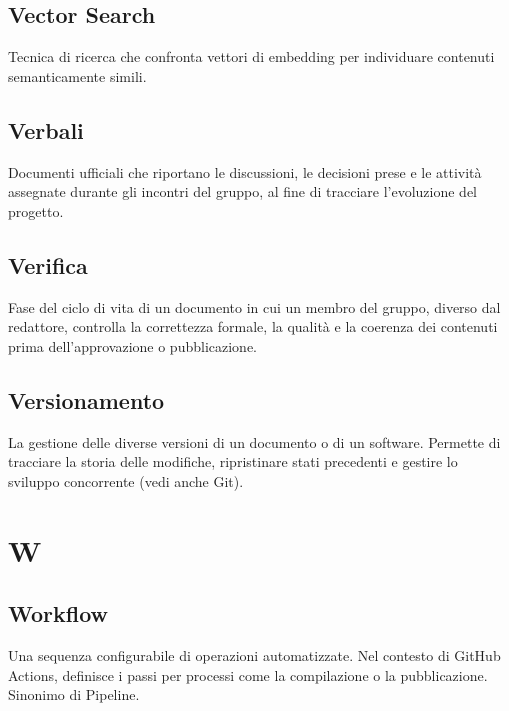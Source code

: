\documentclass[a4paper, 11pt, oneside]{scrartcl} %
\begin{document}

\subsection*{Vector Search}
Tecnica di ricerca che confronta vettori di embedding per individuare contenuti semanticamente simili.
\vspace{0.5cm}

\subsection*{Verbali}


Documenti ufficiali che riportano le discussioni, le decisioni prese e le attività assegnate durante gli incontri del gruppo, al fine di tracciare l'evoluzione del progetto.

\vspace{0.5cm}

\subsection*{Verifica}


Fase del ciclo di vita di un documento in cui un membro del gruppo, diverso dal redattore, controlla la correttezza formale, la qualità e la coerenza dei contenuti prima dell'approvazione o pubblicazione.

\vspace{0.5cm}

\subsection*{Versionamento}
La gestione delle diverse versioni di un documento o di un software. Permette di tracciare la storia delle modifiche, ripristinare stati precedenti e gestire lo sviluppo concorrente (vedi anche Git).
\vspace{0.5cm}


\section*{W}


\subsection*{Workflow}


Una sequenza configurabile di operazioni automatizzate. Nel contesto di GitHub Actions, definisce i passi per processi come la compilazione o la pubblicazione. Sinonimo di Pipeline.

\vspace{0.5cm}
\end{document}
